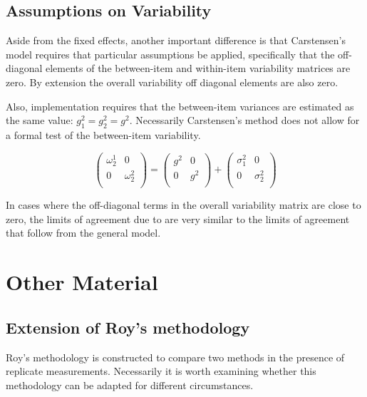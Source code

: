 \documentclass[12pt, a4paper]{report}
\theoremstyle{plain}
\theoremstyle{definition}
\theoremstyle{remark}
\begin{document}
	
\section{Assumptions on Variability}

Aside from the fixed effects, another important difference is that Carstensen's model requires that particular assumptions be applied, specifically that the off-diagonal elements of the between-item
and within-item variability matrices are zero. By extension the
overall variability off diagonal elements are also zero.

Also, implementation requires that the between-item variances are
estimated as the same value: $g^2_1 = g^2_2 = g^2$. Necessarily
Carstensen's method does not allow for a formal test of the
between-item variability.

\[\left(\begin{array}{cc}
\omega^1_2  & 0 \\
0 & \omega^2_2 \\
\end{array}  \right)
=  \left(
\begin{array}{cc}
g^2  & 0 \\
0 & g^2 \\
\end{array} \right)+
\left(
\begin{array}{cc}
\sigma^2_1  & 0 \\
0 & \sigma^2_2 \\
\end{array}\right)
\]

In cases where the off-diagonal terms in the overall variability
matrix are close to zero, the limits of agreement due to
\citet{bxc2008} are very similar to the limits of agreement that
follow from the general model.



\chapter{Other Material}
\section{Extension of Roy's methodology}
Roy's methodology is constructed to compare two methods in the presence of replicate measurements. Necessarily it is worth examining whether this methodology can be adapted for different circumstances.
\end{document}
